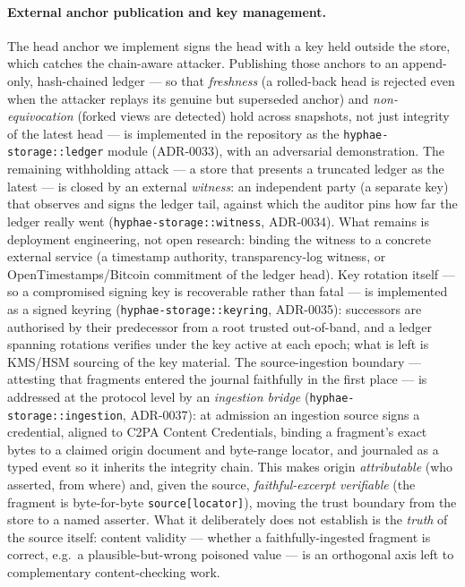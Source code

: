 \paragraph{External anchor publication and key management.} The
head anchor we implement signs the head with a key held outside
the store, which catches the chain-aware attacker. Publishing those
anchors to an append-only, hash-chained ledger --- so that
\emph{freshness} (a rolled-back head is rejected even when the
attacker replays its genuine but superseded anchor) and
\emph{non-equivocation} (forked views are detected) hold across
snapshots, not just integrity of the latest head --- is implemented
in the repository as the \texttt{hyphae-storage::ledger} module
(ADR-0033), with an adversarial demonstration. The remaining
withholding attack --- a store that presents a truncated ledger as
the latest --- is closed by an external \emph{witness}: an
independent party (a separate key) that observes and signs the
ledger tail, against which the auditor pins how far the ledger
really went (\texttt{hyphae-storage::witness}, ADR-0034). What
remains is deployment engineering, not open research: binding the
witness to a concrete external service (a timestamp authority,
transparency-log witness, or OpenTimestamps/Bitcoin commitment of
the ledger head). Key rotation itself --- so a compromised signing
key is recoverable rather than fatal --- is implemented as a signed
keyring (\texttt{hyphae-storage::keyring}, ADR-0035): successors are
authorised by their predecessor from a root trusted out-of-band, and
a ledger spanning rotations verifies under the key active at each
epoch; what is left is KMS/HSM sourcing of the key material. The
source-ingestion boundary --- attesting that fragments entered the
journal faithfully in the first place --- is addressed at the protocol
level by an \emph{ingestion bridge} (\texttt{hyphae-storage::ingestion},
ADR-0037): at admission an ingestion source signs a credential, aligned
to C2PA Content Credentials, binding a fragment's exact bytes to a
claimed origin document and byte-range locator, and journaled as a typed
event so it inherits the integrity chain. This makes origin
\emph{attributable} (who asserted, from where) and, given the source,
\emph{faithful-excerpt verifiable} (the fragment is byte-for-byte
\texttt{source[locator]}), moving the trust boundary from the store to a
named asserter. What it deliberately does not establish is the
\emph{truth} of the source itself: content validity --- whether a
faithfully-ingested fragment is correct, e.g.\ a plausible-but-wrong
poisoned value --- is an orthogonal axis left to complementary
content-checking work.

